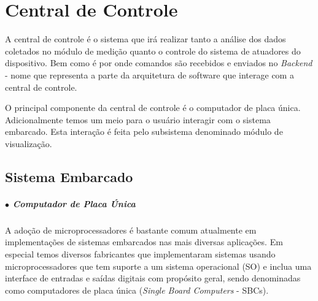     
    

\section{Central de Controle}

A central de controle é o sistema que irá realizar tanto a análise dos dados coletados no módulo de medição quanto o controle do sistema de atuadores do dispositivo. Bem como é por onde comandos são recebidos e enviados  no \textit{Backend} - nome que representa a parte da arquitetura de software que interage com a central de controle. 

O principal componente da central de controle é o computador de placa única. Adicionalmente  temos um meio para o usuário interagir com o sistema embarcado. Esta interação é feita pelo subsistema denominado módulo de visualização.

\subsection{Sistema Embarcado}\label{sec:sistema_embarcado}
    \subparagraph*{$\bullet$ Computador de Placa Única}  \hfill
    
    A adoção de microprocessadores é bastante comum atualmente em implementações de sistemas embarcados nas mais diversas aplicações. Em especial temos diversos fabricantes que implementaram sistemas usando microprocessadores que tem suporte a um sistema operacional (SO) e inclua uma interface de entradas e saídas digitais com propósito geral, sendo denominadas como computadores de placa única (\textit{Single Board Computers} - SBCs). 
    
    
